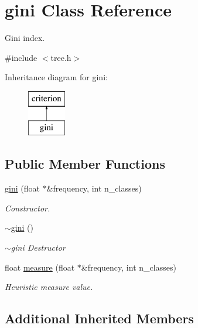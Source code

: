 \hypertarget{classgini}{\section{gini Class Reference}
\label{classgini}
}


Gini index.  




{\ttfamily \#include $<$tree.\+h$>$}

Inheritance diagram for gini\+:\begin{figure}[H]
\begin{center}
\leavevmode
\includegraphics[height=2.000000cm]{classgini}
\end{center}
\end{figure}
\subsection*{Public Member Functions}
\begin{DoxyCompactItemize}
\item 
\hyperlink{classgini_a6b55cd25f78692dd2c7f29f28c6217be}{gini} (float $\ast$\&frequency, int n\+\_\+classes)
\begin{DoxyCompactList}\small\item\em Constructor. \end{DoxyCompactList}\item 
\hyperlink{classgini_ab9bb0e64623a6bf233365bcde20585b0}{$\sim$gini} ()
\begin{DoxyCompactList}\small\item\em $\sim$gini Destructor \end{DoxyCompactList}\item 
float \hyperlink{classgini_a5f232df1155fe182eee9b26cde0e8339}{measure} (float $\ast$\&frequency, int n\+\_\+classes)
\begin{DoxyCompactList}\small\item\em Heuristic measure value. \end{DoxyCompactList}\end{DoxyCompactItemize}
\subsection*{Additional Inherited Members}



